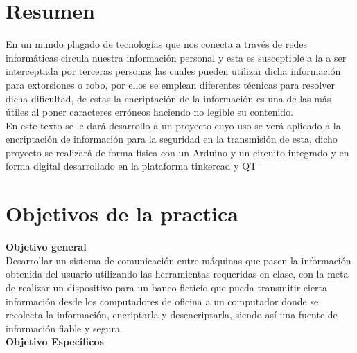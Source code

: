 \documentclass{article}
\begin{document}
\newpage
\section{Resumen}
\label{Resumen}
En un mundo plagado de tecnologías que nos conecta a través de redes informáticas circula nuestra información personal y esta es susceptible a la a ser interceptada por terceras personas las cuales pueden utilizar dicha información para extorsiones o robo, por ellos se emplean diferentes técnicas para resolver dicha dificultad, de estas la encriptación de la información es una de las más útiles al poner caracteres erróneos haciendo no legible su contenido.\\
\newline
En este texto se le dará desarrollo a un proyecto cuyo uso se verá aplicado a la encriptación de información para la seguridad en la transmisión de esta, dicho proyecto se realizará de forma física con un Arduino y un circuito integrado y en forma digital desarrollado en la plataforma tinkercad y QT


\newpage
\section{Objetivos de la practica}
\label{objetivos}
\textbf{Objetivo general}\\
Desarrollar un sistema de comunicación entre máquinas que pasen la información obtenida del usuario utilizando las herramientas requeridas en clase, con la meta de realizar un dispositivo para un banco ficticio que pueda transmitir cierta información desde los computadores de oficina a un computador donde se recolecta la información, encriptarla y desencriptarla, siendo así una fuente de información fiable y segura.\\



\textbf{Objetivo Específicos}
\end{document}

